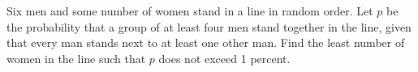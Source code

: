 Six men and some number of women stand in a line in random order. Let $p$ be the probability that a group of at least four men stand together in the line, given that every man stands next to at least one other man. Find the least number of women in the line such that $p$ does not exceed 1 percent.